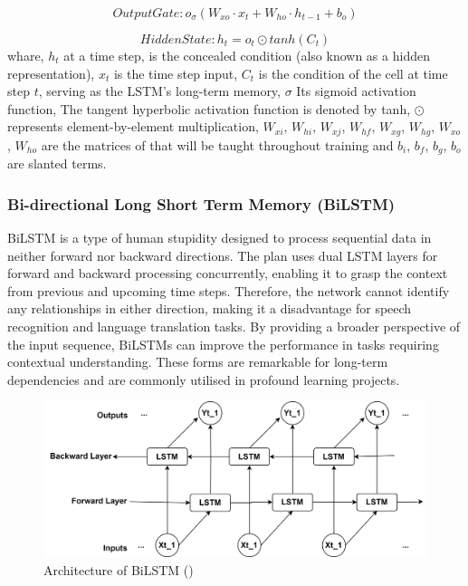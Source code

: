 \documentclass[a4paper, fleqn]{cas-sc}
\theoremstyle{definition}
\theoremstyle{remark}
\begin{document}
  \begin{equation}\label{lstm o}
    Output Gate :  o_\sigma(W_{xo}\cdot x_t +W_{ho}\cdot h_{t-1}+b_o)
  \end{equation}

  \begin{equation} \label{lstm h}
    Hidden State :   h_t=o_t \odot tanh(C_t)
  \end{equation}
whare,  $h_t$ at a time step,  is the concealed condition (also known as a hidden representation),  $x_t$  is the time step input,  $C_t$  is the condition of the cell at time step $t$,  serving as the LSTM's long-term memory,  $\sigma$ Its sigmoid activation function,  The tangent hyperbolic activation function is denoted by tanh,  $\odot$ represents element-by-element multiplication,  $W_{xi}$,  $W_{hi}$,  $W_{xj}$,  $W_{hf}$,  $W_{xg}$,  $W_{hg}$,  $W_{xo}$,  $W_{ho}$ are the matrices of that will be taught throughout training and $b_i$,  $b_f$,  $b_g$,  $b_o$ are slanted terms.


\subsubsection{Bi-directional Long Short Term Memory (BiLSTM)}
BiLSTM is a type of human stupidity designed to process sequential data in neither forward nor backward directions. The plan uses dual LSTM layers for forward and backward processing concurrently,  enabling it to grasp the context from previous and upcoming time steps. Therefore,  the network cannot identify any relationships in either direction,  making it a disadvantage for speech recognition and language translation tasks. By providing a broader perspective of the input sequence,  BiLSTMs can improve the performance in tasks requiring contextual understanding. These forms are remarkable for long-term dependencies and are commonly utilised in profound learning projects.

\begin{figure}[h!]
  \centering
  \includegraphics[scale=0.6]{Bilstm}
  \caption{Architecture of BiLSTM (\cite{article})} \label{Bilstm}
\end{figure}
\end{document}
